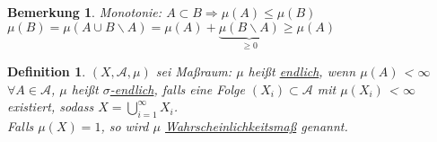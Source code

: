 \documentclass[11pt]{memoir}
\theoremstyle{changebreak}
\newtheorem{Definition}{Definition}[chapter]
\newtheorem{Bemerkung}{Bemerkung}[chapter]
\begin{document}
\begin{Bemerkung}
Monotonie: $A \subset B \Rightarrow \mu(A) \leq \mu(B)$\\
$\mu(B) = \mu(A \cup B\backslash A) = \mu(A) + \underbrace{\mu(B\backslash A)}_{\geq 0}\geq \mu(A)$
\end{Bemerkung}

\begin{Definition}
$(X, \mathscr{A}, \mu)$ sei Maßraum: $\mu$ heißt \underline{endlich}, wenn $\mu(A)$ \textless {} $ \infty $ $\forall A \in \mathscr{A}$, $\mu$ heißt \underline{$\sigma$-endlich}, falls eine Folge $(X_i) \subset \mathscr{A}$ mit $\mu(X_i)$ \textless {} $ \infty $ existiert, sodass $X = \bigcup\limits_{i=1}^{\infty} X_i$. \\
Falls $\mu(X) = 1$, so wird $\mu$ \underline{Wahrscheinlichkeitsmaß} genannt.
\end{Definition}
\end{document}
